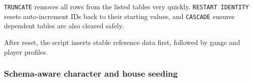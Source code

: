 \texttt{TRUNCATE} removes all rows from the listed tables very quickly.
\texttt{RESTART\ IDENTITY} resets auto-increment IDs back to their
starting values, and \texttt{CASCADE} ensures dependent tables are also
cleared safely.

After reset, the script inserts stable reference data first, followed by
gangs and player profiles.

\begin{Shaded}
\begin{Highlighting}[]
  \NormalTok{ (}\NormalTok{ (}\NormalTok{, }\NormalTok{), (}\NormalTok{, }\NormalTok{);}
 \NormalTok{ (}\NormalTok{, }\NormalTok{), (}\NormalTok{, }\NormalTok{), (}\NormalTok{, }\NormalTok{);}
 \NormalTok{ (}\NormalTok{, }\NormalTok{), (}\NormalTok{, }\NormalTok{), (}\NormalTok{, }\NormalTok{);}
 \NormalTok{ (}\NormalTok{, }\NormalTok{), (}\NormalTok{, }\NormalTok{), (}\NormalTok{, }\NormalTok{);}
\end{Highlighting}
\end{Shaded}

\hypertarget{schema-aware-character-and-house-seeding}{%
\subsubsection{Schema-aware character and house
seeding}\label{schema-aware-character-and-house-seeding}}

